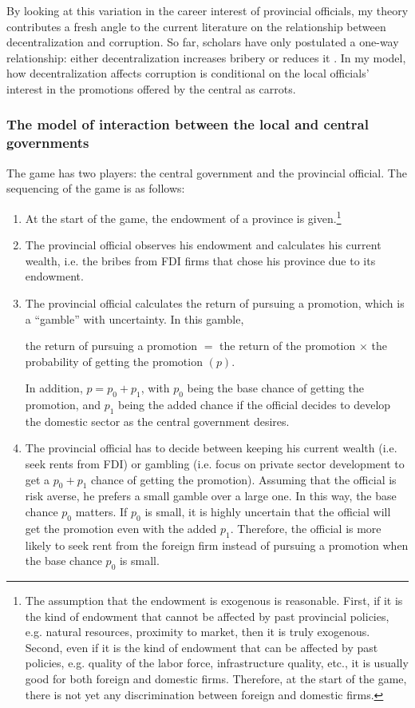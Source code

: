 By looking at this variation in the career interest of provincial officials, my theory contributes a fresh angle to the current literature on the relationship between decentralization and corruption. So far, scholars have only postulated a one-way relationship: either decentralization increases bribery \citep{Fan2009} or reduces it \citep{Guerra2009}. In my model, how decentralization affects corruption is conditional on the local officials' interest in the promotions offered by the central as carrots.

\subsubsection{The model of interaction between the local and central governments}

The game has two players: the central government and the provincial official. The sequencing of the game is as follows:
\begin{enumerate}
\item At the start of the game, the endowment of a province is given.\footnote{The assumption that the endowment is exogenous is reasonable. First, if it is the kind of endowment that cannot be affected by past provincial policies, e.g. natural resources, proximity to market, then it is truly exogenous. Second, even if it is the kind of endowment that can be affected by past policies, e.g. quality of the labor force, infrastructure quality, etc., it is usually good for both foreign and domestic firms. Therefore, at the start of the game, there is not yet any discrimination between foreign and domestic firms.}
\item The provincial official observes his endowment and calculates his current wealth, i.e. the bribes from FDI firms that chose his province due to its endowment.
\item The provincial official calculates the return of pursuing a promotion, which is a ``gamble'' with uncertainty. In this gamble,

the return of pursuing a promotion $=$ the return of the promotion $\times$ the probability of getting the promotion $(p)$.

In addition, $p = p_0 + p_1$, with $p_0$ being the base chance of getting the promotion, and $p_1$ being the added chance if the official decides to develop the domestic sector as the central government desires.

\item The provincial official has to decide between keeping his current wealth (i.e. seek rents from FDI) or gambling (i.e. focus on private sector development to get a $p_0 + p_1$ chance of getting the promotion). Assuming that the official is risk averse, he prefers a small gamble over a large one. In this way, the base chance $p_0$ matters. If $p_0$ is small, it is highly uncertain that the official will get the promotion even with the added $p_1$. Therefore, the official is more likely to seek rent from the foreign firm instead of pursuing a promotion when the base chance $p_0$ is small. 
\end{enumerate}

